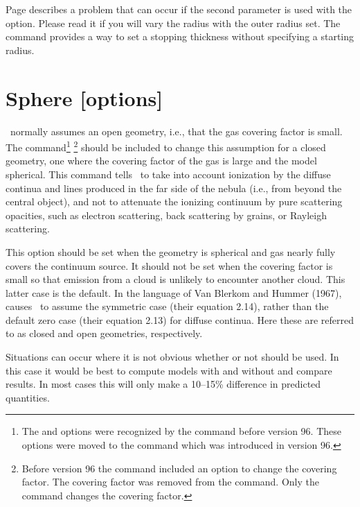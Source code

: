Page \pageref{sec:RadiusVaryOptions} describes a problem
that can occur if the second parameter is used with the
 option.
Please read it if you will vary the radius
with the outer radius set.
The  command provides a way to set
a stopping thickness without specifying a starting radius.

\section{Sphere [options]}
\label{sec:CommandSphere}

\Cloudy\ normally assumes an open geometry, i.e.,
that the gas covering factor is small.
The  command\footnote{The  and 
options were recognized by the  command before
version 96.  These options were moved to the  command which was
introduced in version 96.} \footnote{Before version 96 the  command included an option to change
the covering factor.  The covering factor was removed from the
command.  Only the  command changes the covering
factor.} should be included
to change this assumption for a closed geometry,
one where the covering factor of the gas is large and the model spherical.
This command tells \Cloudy\ to take into account ionization by the diffuse
continua and lines produced in the far side of the nebula
(i.e., from beyond the central object), and not to attenuate
the ionizing continuum by pure
scattering opacities, such as electron scattering,
back scattering by grains,
or Rayleigh scattering.

This option should be set when the geometry is spherical and gas nearly
fully covers the continuum source.
It should not be set when the covering
factor is small so that emission from a cloud is unlikely to encounter
another cloud.
This latter case is the default.
In the language of Van
Blerkom and Hummer (1967), 
causes \Cloudy\ to assume the symmetric
case (their equation 2.14),
rather than the default zero case (their equation
2.13) for diffuse continua.
Here these are referred to as closed and open
geometries, respectively.

Situations can occur where it is not obvious whether or not
 should
be used.
In this case it would be best to compute models with and without
 and compare results.
In most cases this will only make a 10--15\%
difference in predicted quantities.

